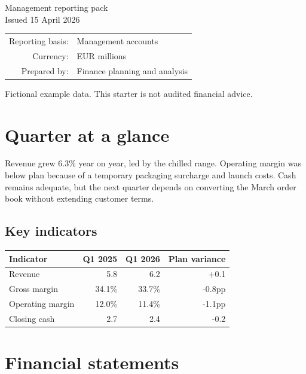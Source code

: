 \documentclass[11pt,a4paper]{report}
\begin{document}
\begin{titlepage}\centering{}\vspace{0.5cm}{\Large Corporate quarterly financial statement\par}\vspace{1cm}\large Management reporting pack\\Issued 15 April 2026
\vfill\begin{tabular}{rl}Reporting basis:& Management accounts\\Currency:& EUR millions\\Prepared by:& Finance planning and analysis\end{tabular}
\vfill{\small Fictional example data. This starter is not audited financial advice.}\end{titlepage}
\chapter{Quarter at a glance}
Revenue grew 6.3\% year on year, led by the chilled range. Operating margin was below plan because of a temporary packaging surcharge and launch costs. Cash remains adequate, but the next quarter depends on converting the March order book without extending customer terms.
\section{Key indicators}
\begin{center}
\begin{tabular}{lrrr}\toprule Indicator & Q1 2025 & Q1 2026 & Plan variance\\\midrule Revenue & 5.8 & 6.2 & +0.1\\ Gross margin & 34.1\% & 33.7\% & -0.8pp\\ Operating margin & 12.0\% & 11.4\% & -1.1pp\\ Closing cash & 2.7 & 2.4 & -0.2\\\bottomrule\end{tabular}\end{center}
\chapter{Financial statements}
\end{document}
